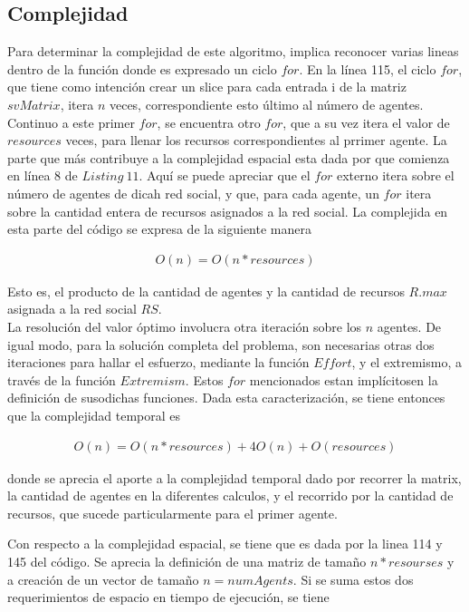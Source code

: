 \documentclass[letterpaper,10pt]{article}
\begin{document}
\subsection{Complejidad}
Para determinar la complejidad de este algoritmo, implica reconocer varias lineas dentro de la función donde es expresado un ciclo $for$. En la línea 115, el ciclo $for$, que tiene como intención crear un slice para cada entrada i de la matriz $svMatrix$, itera $n$ veces, correspondiente esto último al número de agentes. Continuo a este primer $for$, se encuentra otro $for$, que a su vez itera el valor de $resources$ veces, para llenar los recursos correspondientes al prrimer agente. La parte que más contribuye a la complejidad espacial esta dada por que comienza en línea 8 de $Listing~11$. Aquí se puede apreciar que el $for$ externo itera sobre el número de agentes de dicah red social, y que, para cada agente, un $for$ itera sobre la cantidad entera de recursos asignados a la red social. La complejida en esta parte del código se expresa de la siguiente manera

\begin{align*}
  O(n) = O(n*resources)
\end{align*}

Esto es, el producto de la cantidad de agentes y la cantidad de recursos $R.max$ asignada a la red social $RS$.\\
La resolución del valor óptimo involucra otra iteración sobre los $n$ agentes. De igual modo, para la solución completa del problema, son necesarias otras dos iteraciones para hallar el esfuerzo, mediante la función $Effort$, y el extremismo, a través de la función $Extremism$. Estos $for$ mencionados estan implícitosen la definición de susodichas funciones.
Dada esta caracterización, se tiene entonces que la complejidad temporal es

\begin{align*}
  O(n) = O(n*resources) + 4O(n) + O(resources)
\end{align*}

donde se aprecia el aporte a la complejidad temporal dado por recorrer la matrix, la cantidad de agentes en la diferentes calculos, y el recorrido por la cantidad de recursos, que sucede particularmente para el primer agente.

Con respecto a la complejidad espacial, se tiene que es dada por la linea 114 y 145 del código. Se aprecia la definición de una matriz de tamaño $n*resourses$ y a creación de un vector de tamaño $n=numAgents$. Si se suma estos dos requerimientos de espacio en tiempo de ejecución, se tiene  
\end{document}
